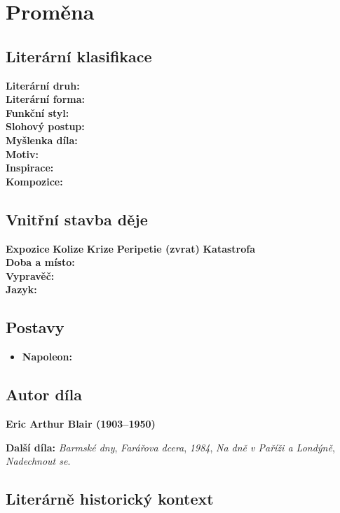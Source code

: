 \documentclass[12pt, a4paper]{article}
\newcommand{\mybf}[1]{\textcolor[RGB]{0, 179, 219}{\textbf{#1}}}
\begin{document}
\section{Proměna}

\subsection*{Literární klasifikace}
\mybf{Literární druh:} \\[3pt]
\mybf{Literární forma:} \\[3pt]
\mybf{Funkční styl:} \\[3pt]
\mybf{Slohový postup:} \\[10pt]
\mybf{Myšlenka díla:} \\[10pt]
\mybf{Motiv:} \\[10pt]
\mybf{Inspirace:} \\[10pt]
\mybf{Kompozice:} 

\subsection*{Vnitřní stavba děje}
\noindent\textbf{Expozice} 
\noindent\textbf{Kolize} 
\noindent\textbf{Krize} 
\noindent\textbf{Peripetie (zvrat)} 
\noindent\textbf{Katastrofa} \\[10pt]
\mybf{Doba a místo:} \\[10pt]
\mybf{Vypravěč:} \\[10pt]
\mybf{Jazyk:} 

\subsection*{Postavy}
\begin{itemize}[itemsep=0.3em]
	\item \textbf{Napoleon:}
\end{itemize}

\subsection*{Autor díla}
\textbf{Eric Arthur Blair (1903--1950)}

\textbf{Další díla:} \textit{Barmské dny}, \textit{Farářova dcera}, \textit{1984}, \textit{Na dně v Paříži a Londýně}, \textit{Nadechnout se}.

\subsection*{Literárně historický kontext}
\end{document}

